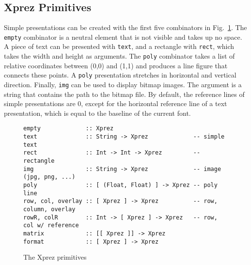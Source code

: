 \subsection{{\sc Xprez} Primitives}
\label{primitives}
\par Simple presentations can be created with the first five combinators in
        Fig.~\ref{xprezprim}. The \texttt{empty} combinator is a neutral
        element that is not visible and takes up no space. A piece of text can be
        presented with \texttt{text}, and a rectangle with \texttt{rect}, which takes
        the width and height as arguments. The \texttt{poly} combinator takes a list of
        relative coordinates between (0,0) and (1,1) and produces a line figure that
        connects these points. A \texttt{poly} presentation stretches in horizontal and
        vertical direction. Finally, \texttt{img} can be used to display bitmap images.
        The argument is a string that contains the path to the bitmap file. By default,
        the reference lines of simple presentations are 0, except for the horizontal
        reference line of a text presentation, which is equal to the baseline of the
        current font.
\begin{figure}
\begin{small}
\begin{center}
\begin{small}\begin{verbatim}empty             :: Xprez
text              :: String -> Xprez             -- simple text
rect              :: Int -> Int -> Xprez         -- rectangle
img               :: String -> Xprez             -- image (jpg, png, ...)
poly              :: [ (Float, Float) ] -> Xprez -- poly line
row, col, overlay :: [ Xprez ] -> Xprez          -- row, column, overlay
rowR, colR        :: Int -> [ Xprez ] -> Xprez   -- row, col w/ reference
matrix            :: [[ Xprez ]] -> Xprez
format            :: [ Xprez ] -> Xprez\end{verbatim}\end{small}
\caption{The {\sc Xprez} primitives}\label{xprezprim} 
\end{center}
\end{small}
\end{figure}


